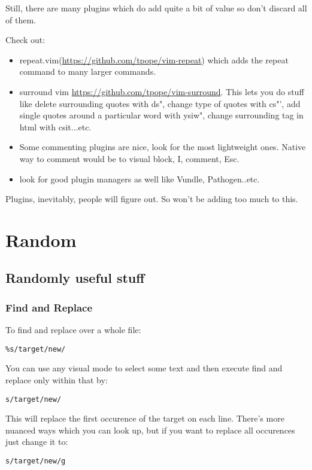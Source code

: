 \documentclass[12pt, letterpaper]{article}
\begin{document}
Still, there are many plugins which do add quite a bit of value so don't
discard all of them.

Check out: 
\begin{itemize}
    \item repeat.vim(\url{https://github.com/tpope/vim-repeat}) which adds the
        repeat command to many larger commands.
    \item surround vim \url{https://github.com/tpope/vim-surround}. This lets
        you do stuff like delete surrounding quotes with ds", change type of
        quotes with cs"', add single quotes around a particular word with
        ysiw", change surrounding tag in html with csit...etc.
    \item Some commenting plugins are nice, look for the most lightweight ones.
        Native way to comment would be to visual block, I, comment, Esc.
    \item look for good plugin managers as well like Vundle, Pathogen..etc.
\end{itemize}


Plugins, inevitably, people will figure out. So won't be adding too much to
this.


\section{Random}
\subsection{Randomly useful stuff}

\subsubsection{Find and Replace}
To find and replace over a whole file:
\begin{verbatim}
%s/target/new/
\end{verbatim}

You can use any visual mode to select some text and then execute find and
replace only within that by:
\begin{verbatim}
s/target/new/
\end{verbatim}
This will replace the first occurence of the target on each line. There's more
nuanced ways which you can look up, but if you want to replace all occurences
just change it to:
\begin{verbatim}
s/target/new/g
\end{verbatim}
\end{document}

